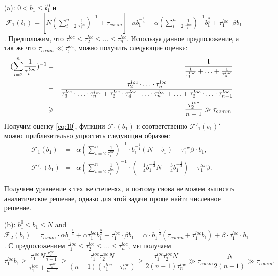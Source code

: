 \documentclass{article}
\theoremstyle{definition}
\theoremstyle{plain}
\begin{document}
\begin{itemize}
    \item [(a):] $0 < b_1 \leq b_1^0$ и 
    $~\mathcal{F}_1(b_1) = [N (\sum\limits_{i = 2}^{n} \frac{1}{\tau_i^{loc}})^{-1} + \tau_{comm}]\cdot 
    \alpha  b_1^{-\frac{1}{4}} - 
    \alpha(\sum\limits_{i =
    2}^{n} \frac{1}{\tau_i^{loc}})^{-1} b_1^{\frac{3}{4}}  + \tau_1^{loc}\cdot\beta b_1$. Предположим, что
    $
    \tau_1^{loc} \leq \tau_2^{loc} \leq\ldots \leq \tau_n^{loc}.
    $
    Используя данное предположение, а так же что $\tau_{comm} \ll \tau_i^{loc}$, можно получить следующие оценки:
    \begin{eqnarray}
        \label{eq:10}
            (\sum\limits_{i = 2}^n \frac{1}{\tau_i^{loc}})^{-1} &=& \frac{1}{\frac{1}{\tau_1^{loc}} + \ldots + \frac{1}{\tau_n^{loc}}}
            \notag\\ &=& 
            \frac{\tau_2^{loc}\cdot \ldots \cdot\tau_n^{loc}}{\tau_3^{loc}\cdot \ldots \cdot\tau_n^{loc} + \tau_2^{loc}\cdot \tau_4^{loc}\cdot\ldots \cdot\tau_n^{loc} + \ldots + \tau_2^{loc}\cdot \ldots \cdot\tau_{n-1}^{loc}} 
            \notag\\ &\geq&\frac{\tau_2^{loc}}{n - 1} \gg \tau_{comm}.
    \end{eqnarray}
    Получим оценку \eqref{eq:10}, функции $\mathcal{F}_1(b_1)$ и соответственно $\mathcal{F'}_1(b_1)'$ можно приблизительно упростить следующим образом:
    \begin{eqnarray*}
            \mathcal{F}_1(b_1) &=& \alpha(\sum\limits_{i = 2}^n \frac{1}{\tau_i^{loc}})^{-1}\cdot b_1^{-\frac{1}{4}}(N - b_1) + \tau_1^{loc}\beta\cdot b_1,
            \\
        \mathcal{F'}_1 (b_1) &=& \alpha(\sum\limits_{i = 2}^n \frac{1}{\tau_i^{loc}})^{-1}\cdot (-\frac{1}{4}b_1^{-\frac{5}{4}}N - \frac{3}{4}b_1^{-\frac{1}{4}}) + \tau_1^{loc}\beta.
    \end{eqnarray*}
    
    
    Получаем уравнение в тех же степенях, и поэтому снова не можем выписать аналитическое решение, однако для этой задачи проще найти численное решение.

    \item[(b):] $b_1^0\leq b_1\leq N$ and $\mathcal{F}_2(b_1) = \tau_{comm}\cdot 
    \alpha  b_1^{-\frac{1}{4}} + 
    \alpha\tau_1^{loc} b_1^{\frac{3}{4}}  + \tau_1^{loc}\cdot \beta b_1 =  \alpha\cdot b_1^{-\frac{1}{4}}(\tau_{comm} + \tau_1^{loc}b_1) + \beta\cdot\tau_1^{loc}\cdot b_1$. С предположением $
    \tau_1^{loc} \leq \tau_2^{loc} \leq\ldots \leq \tau_n^{loc}
    $, мы получаем
    \begin{equation}
    \label{eq:11}
      \tau_1^{loc}b_1 {\geq} \frac{\tau_1^{loc}N\frac{\tau_2^{loc}}{n - 1}}{\tau_1^{loc} + \frac{\tau_n^{loc}}{n - 1}}\geq \frac{\tau_1^{loc}\tau_2^{loc}N}{(n - 1)(\tau_1^{loc} + \tau_n^{loc})}\geq \frac{\tau_1^{loc}\tau_2^{loc}N}{2(n - 1)\tau_n^{loc}} \gg
       \tau_{comm}\frac{N}{2(n - 1)} \gg \tau_{comm}.
    \end{equation}
    

\end{itemize}
\end{document}
